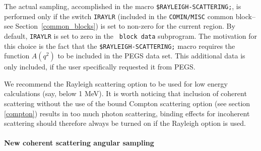   
The actual sampling, accomplished in the macro 
{\tt \$RAYLEIGH-SCATTERING;}, is performed only 
if the switch {\tt IRAYLR} (included
in the {\tt COMIN/MISC} common block--see Section~\ref{common_blocks}) 
is set to non-zero for the current 
region. By default, {\tt IRAYLR} is set to zero in the {\tt 
block data} subprogram. The motivation for this choice is 
the fact that the {\tt \$RAYLEIGH-SCATTERING;} macro 
requires the function $A(q^2)$ to be included in the PEGS data
set. This additional data is only included, if the user specifically
requested it from PEGS. 

We recommend the Rayleigh 
scattering option to be used for low energy calculations 
(say, below 1 MeV). It is worth noticing that 
inclusion of coherent scattering without the use 
of the bound Compton scattering option (see section \ref{compton}) 
results in too much photon scattering, binding effects 
for incoherent scattering should therefore always be turned 
on if the Rayleigh option is used.

\paragraph{New coherent scattering angular sampling}\hfill
\label{new_rayleigh_sampling}

